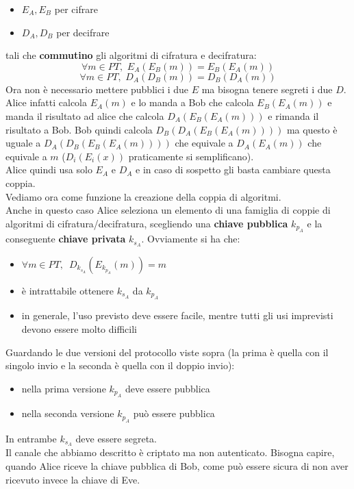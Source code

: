 \documentclass[a4paper,12pt, oneside]{book}
\begin{document}
\begin{itemize}
  \item $E_A,E_B$ per cifrare
  \item $D_A,D_B$ per decifrare
\end{itemize}
tali che \textbf{commutino} gli algoritmi di cifratura e decifratura:
\[\forall m\in PT,\,\,E_A(E_B(m))=E_B(E_A(m))\]
\[\forall m\in PT,\,\,D_A(D_B(m))=D_B(D_A(m))\]
Ora non è necessario mettere pubblici i due $E$ ma bisogna tenere 
segreti i due $D$.\\
Alice infatti calcola $E_A(m)$ e lo manda a Bob che calcola $E_B(E_A(m))$ e
manda il risultato ad alice che calcola $D_A(E_B(E_A(m)))$ e rimanda il
risultato a Bob. Bob quindi calcola $D_B(D_A(E_B(E_A(m))))$ ma questo è uguale a
$D_A(D_B(E_B(E_A(m))))$ che equivale a $D_A(E_A(m))$ che equivale a $m$
($D_i(E_i(x))$ praticamente si semplificano).\\
Alice quindi usa solo $E_A$ e $D_A$ e in caso di sospetto gli basta cambiare
questa coppia.\\
Vediamo ora come funzione la creazione della coppia di algoritmi.\\
Anche in questo caso Alice seleziona un elemento di una famiglia di coppie di
algoritmi di cifratura/decifratura, scegliendo una \textbf{chiave pubblica}
$k_{p_A}$ e la conseguente \textbf{chiave privata} $k_{s_A}$. Ovviamente si ha
che:
\begin{itemize}
  \item $\forall m\in PT,\,\,\,D_{k_{s_A}}(E_{k_{p_A}}(m))=m$
  \item è intrattabile ottenere $k_{s_A}$ da $k_{p_A}$
  \item in generale, l'uso previsto deve essere facile, mentre tutti gli usi
  imprevisti devono essere molto difficili  
\end{itemize}
Guardando le due versioni del protocollo viste sopra (la prima è quella con il
singolo invio e la seconda è quella con il doppio invio):
\begin{itemize}
  \item nella prima versione $k_{p_A}$ deve essere pubblica
  \item nella seconda versione $k_{p_A}$ può essere pubblica
\end{itemize}
In entrambe $k_{s_A}$ deve essere segreta.\\
Il canale che abbiamo descritto è criptato ma non autenticato. Bisogna capire,
quando Alice riceve la chiave pubblica di Bob, come può essere sicura di non
aver ricevuto invece la chiave di Eve.\\
\end{document}
